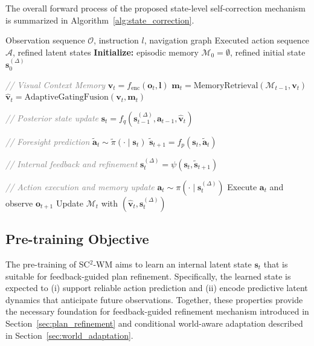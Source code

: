 \documentclass{article}
\theoremstyle{plain}
\theoremstyle{definition}
\theoremstyle{remark}
\begin{document}
The overall forward process of the proposed state-level self-correction mechanism is summarized in Algorithm~\ref{alg:state_correction}.

\begin{algorithm}[htbp]
\caption{Feedback-Guided Plan Refinement \textit{(Forward Pass)}}
\label{alg:state_correction}
\begin{algorithmic}[1]
\REQUIRE Observation sequence \(\mathcal{O}\), instruction \(l\), navigation graph
\ENSURE Executed action sequence \(\mathcal{A}\), refined latent states
\STATE \textbf{Initialize:} episodic memory \(\mathcal{M}_0 = \emptyset\), refined initial state \(\boldsymbol{s}_0^{(\Delta)}\)

    \STATE \textcolor{gray}{\textit{// Visual Context Memory}}
    \STATE \(\boldsymbol{v}_t = f_{\mathrm{enc}}(\boldsymbol{o}_t, \boldsymbol{l})\)
    \STATE \(\boldsymbol{m}_t = \mathrm{MemoryRetrieval}(\mathcal{M}_{t-1}, \boldsymbol{v}_t)\)
    \STATE \(\boldsymbol{\hat{v}}_t = \mathrm{AdaptiveGatingFusion}(\boldsymbol{v}_t, \boldsymbol{m}_t)\)
    
    \STATE \textcolor{gray}{\textit{// Posterior state update}}
    \STATE \(\boldsymbol{s}_t = f_q(\boldsymbol{s}_{t-1}^{({\Delta})}, \boldsymbol{a}_{t-1}, \boldsymbol{\hat{v}}_t)\)
    
    \STATE \textcolor{gray}{\textit{// Foresight prediction}}
    \STATE \(\boldsymbol{\tilde{a}}_t \sim \tilde{\pi}(\cdot \mid \boldsymbol{s}_t)\)
    \STATE \(\boldsymbol{\tilde{s}}_{t+1} = f_p(\boldsymbol{s}_t, \boldsymbol{\tilde{a}}_t)\)
    
    \STATE \textcolor{gray}{\textit{// Internal feedback and refinement}}
    \STATE \(\boldsymbol{s}_t^{(\Delta)} = \psi(\boldsymbol{s}_t, \boldsymbol{\tilde{s}}_{t+1})\)
    
    \STATE \textcolor{gray}{\textit{// Action execution and memory update}}
    \STATE \(\boldsymbol{a}_t \sim \pi(\cdot \mid \boldsymbol{s}_t^{({\Delta})})\)
    \STATE Execute \(\boldsymbol{a}_t\) and observe \(\boldsymbol{o}_{t+1}\)
    \STATE Update \(\mathcal{M}_t\) with \((\boldsymbol{\hat{v}}_t, \boldsymbol{s}_t^{(\Delta)})\)
\ENDFOR
\end{algorithmic}
\end{algorithm}






\subsection{Pre-training Objective}
\label{sec:training}
The pre-training of SC$^{2}$-WM aims to learn an internal latent state $\boldsymbol{s}_t$ that is suitable for feedback-guided plan refinement.
Specifically, the learned state is expected to (i) support reliable action prediction and (ii) encode predictive latent dynamics that anticipate future observations.
Together, these properties provide the necessary foundation for feedback-guided refinement mechanism introduced in Section~\ref{sec:plan_refinement} and conditional world-aware adaptation described in Section~\ref{sec:world_adaptation}.
\end{document}
